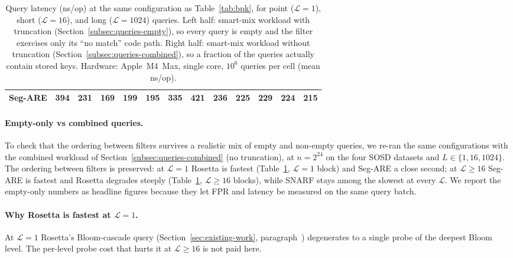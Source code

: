 \begin{table}[H]
\begin{tabular}{@{}lrrrrrr|rrrrrr@{}}
        Seg-ARE & 394          & \textbf{231}     & \textbf{169}     & \textbf{199}     & \textbf{195}     & \textbf{335}     & 421          & \textbf{236}     & \textbf{225}     & \textbf{229}     & \textbf{224}     & \textbf{215}     \\
        \bottomrule
    \end{tabular}
    \caption{Query latency (ns/op) at the same configuration as
        Table~\ref{tab:bpk}, for point ($\mathcal{L}=1$),
        short ($\mathcal{L}=16$), and long ($\mathcal{L}=1024$) queries.
        Left half: smart-mix workload with truncation
        (Section~\ref{subsec:queries-empty}), so every query is
        empty and the filter exercises only its ``no match''
        code path. Right half: smart-mix workload without
        truncation (Section~\ref{subsec:queries-combined}), so a
        fraction of the queries actually contain stored keys.
        Hardware: Apple~M4~Max, single core,
        $10^6$ queries per cell (mean ns/op).}
    \label{tab:latency}
\end{table}

\paragraph{Empty-only vs combined queries.}
To check that the ordering between filters survives a realistic
mix of empty and non-empty queries, we re-ran the same
configurations with the combined workload of
Section~\ref{subsec:queries-combined} (no truncation), at
$n = 2^{24}$ on the four SOSD datasets and $L \in \{1, 16, 1024\}$.
The ordering between filters is preserved: at $\mathcal{L} = 1$
Rosetta is fastest (Table~\ref{tab:latency}, $\mathcal{L}=1$ block)
and Seg-ARE a close second; at $\mathcal{L} \geq 16$ Seg-ARE is
fastest and Rosetta degrades steeply
(Table~\ref{tab:latency}, $\mathcal{L} \geq 16$ blocks), while
SNARF stays among the slowest at every $\mathcal{L}$.
We report the empty-only numbers as headline figures because
they let FPR and latency be measured on the same query batch.

\paragraph{Why Rosetta is fastest at $\mathcal{L} = 1$.}
At $\mathcal{L} = 1$ Rosetta's Bloom-cascade query
(Section~\ref{sec:existing-work}, paragraph~)
degenerates to a single probe of the deepest Bloom level. The
per-level probe cost that hurts it at $\mathcal{L} \geq 16$ is
not paid here.


